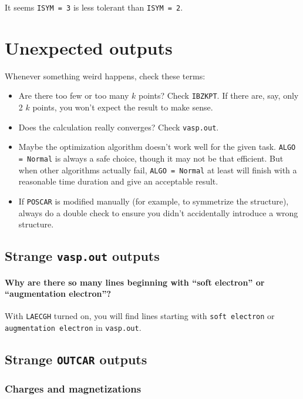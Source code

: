 \documentclass[hyperref, a4paper]{article}
\begin{document}
It seems \texttt{ISYM = 3} is less tolerant than \texttt{ISYM = 2}.

\section{Unexpected outputs}

Whenever something weird happens, check these terms:
\begin{itemize}
    \item Are there too few or too many $k$ points? Check \texttt{IBZKPT}. If there are, say, only 2 $k$ points, you won't expect the result to make sense.
    \item Does the calculation really converges? Check \texttt{vasp.out}. 
    \item Maybe the optimization algorithm doesn't work well for the given task. \texttt{ALGO = Normal} is always a safe choice, though it may not be that efficient. But when other algorithms actually fail, \texttt{ALGO = Normal} at least will finish with a reasonable time duration and give an acceptable result.
    \item If \texttt{POSCAR} is modified manually (for example, to symmetrize the structure), always do a double check to ensure you didn't accidentally introduce a wrong structure.
\end{itemize}

\subsection{Strange \texttt{vasp.out} outputs}

\paragraph{Why are there so many lines beginning with ``soft electron'' or ``augmentation electron''?}

With \texttt{LAECGH} turned on, you will find lines starting with \texttt{soft electron} or \texttt{augmentation electron} in \texttt{vasp.out}.

\subsection{Strange \texttt{OUTCAR} outputs}

\subsubsection{Charges and magnetizations}
\end{document}
